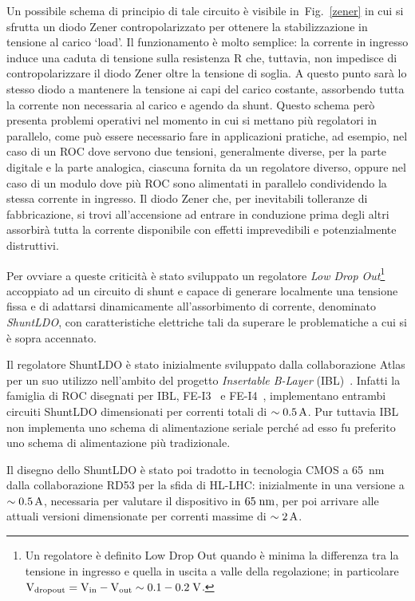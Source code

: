 Un possibile schema di principio di tale circuito \`e visibile in~Fig.~\ref{zener} in cui si sfrutta un diodo Zener contropolarizzato per ottenere la stabilizzazione in tensione al carico `load'. Il funzionamento è molto semplice: la corrente in ingresso induce una caduta di tensione sulla resistenza R che, tuttavia, non impedisce di contropolarizzare il diodo Zener oltre la tensione di soglia. A questo punto sarà lo stesso diodo a mantenere la tensione ai capi del carico costante, assorbendo tutta la corrente non necessaria al carico e agendo da shunt. 
Questo schema però presenta problemi operativi nel momento in cui si mettano più regolatori in parallelo, come pu\`o essere necessario fare in applicazioni pratiche, ad esempio, nel caso di un ROC dove servono due tensioni, generalmente diverse, per la parte digitale e la parte analogica, ciascuna fornita da un regolatore diverso, oppure nel caso di un modulo dove pi\`u ROC sono alimentati in parallelo condividendo la stessa corrente in ingresso. Il diodo Zener che, per inevitabili tolleranze di fabbricazione, si trovi all'accensione ad entrare in conduzione prima degli altri assorbir\`a tutta la corrente disponibile con effetti imprevedibili e potenzialmente distruttivi. 

Per ovviare a queste criticità è stato sviluppato un regolatore \textit{Low Drop Out}\footnote{Un regolatore è definito Low Drop Out quando \`e minima la differenza tra la tensione in ingresso e quella in uscita a valle della regolazione; in particolare $\mathrm{V_{dropout}=V_{in}-V_{out}\sim 0.1-0.2 \rm \; V}$.} accoppiato ad un circuito di shunt e capace di generare localmente una tensione fissa e di adattarsi dinamicamente all'assorbimento di corrente, denominato {\em ShuntLDO}, con caratteristiche elettriche tali da superare le problematiche a cui si \`e sopra accennato.

Il regolatore ShuntLDO \`e stato inizialmente sviluppato dalla collaborazione Atlas per un suo utilizzo nell'ambito del progetto {\em Insertable B-Layer} (IBL)~\cite{IBL}. Infatti la famiglia di ROC disegnati per IBL, FE-I3~\cite{ROCFEI3} e FE-I4~\cite{ROCFEI4}, implementano entrambi circuiti ShuntLDO dimensionati per correnti totali di $\sim 0.5\rm \, A$. Pur tuttavia IBL non implementa uno schema di alimentazione seriale perch\'e ad esso fu preferito uno schema di alimentazione pi\`u tradizionale.

Il disegno dello ShuntLDO \`e stato poi tradotto in tecnologia CMOS a 65~nm dalla collaborazione RD53 per la sfida di HL-LHC: inizialmente in una versione a $\sim 0.5\rm \, A$, necessaria per valutare il dispositivo in $65\rm \; nm$, per poi arrivare alle attuali versioni dimensionate per correnti massime di $\sim 2\rm \, A$.

